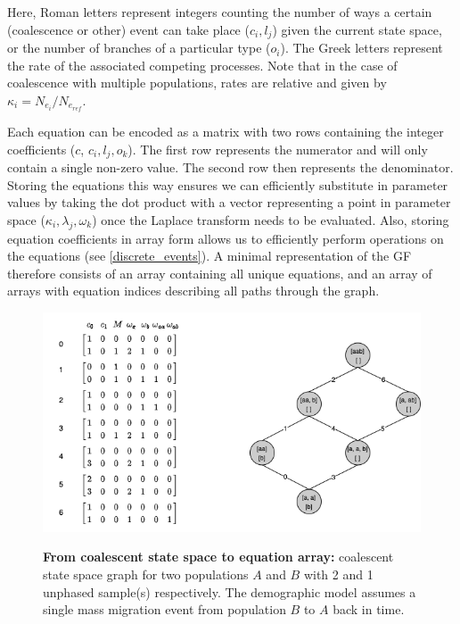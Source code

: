 \documentclass[10pt, a4]{article}
\begin{document}
Here, Roman letters represent integers counting the number of ways a certain (coalescence or other) event can take place ($c_i, l_j$) given the current state space, or the number of branches of a particular type ($o_i$). The Greek letters represent the rate of the associated competing processes. Note that in the case of coalescence with multiple populations, rates are relative and given by $\kappa_i = N_{e_{i}}/N_{e_{ref}}$.

Each equation can be encoded as a matrix with two rows containing the integer coefficients ($c$, $c_i, l_j, o_k$). The first row represents the numerator and will only contain a single non-zero value. The second row then represents the denominator. Storing the equations this way ensures we can efficiently substitute in parameter values by taking the dot product with a vector representing a point in parameter space ($\kappa_i, \lambda_j, \omega_k$) once the Laplace transform needs to be evaluated. Also, storing equation coefficients in array form allows us to efficiently perform operations on the equations (see \ref{discrete_events}). A minimal representation of the GF therefore consists of an array containing all unique equations, and an array of arrays with equation indices describing all paths through the graph. 

\begin{figure}
\begin{center}
\includegraphics[scale=0.5]{figures/temp2b.png} \label{fig:graph}
\end{center}
\caption{\textbf{From coalescent state space to equation array:} coalescent state space graph for two populations $A$ and $B$ with 2 and 1 unphased sample(s) respectively. The demographic model assumes a single mass migration event from population $B$ to $A$ back in time.}
\end{figure}
\end{document}
